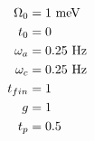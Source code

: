 \begin{align*} 
\Omega_{0} &= 1\mathrm{\mbox{ meV }}\\ 
t_{0} &= 0\mathrm{}\\ 
\omega_{a} &= 0.25\mathrm{\mbox{ Hz }}\\ 
\omega_{c} &= 0.25\mathrm{\mbox{ Hz }}\\ 
t_{{\it fin}} &= 1\mathrm{}\\ 
g &= 1\mathrm{}\\ 
t_{p} &= 0.5\mathrm{}\\ 
\end{align*} 
